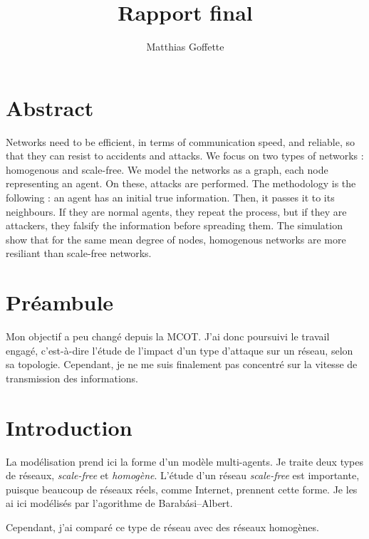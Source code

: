 \documentclass[11pt,a4paper]{article}
\title{Rapport final}
\author{Matthias Goffette}
\begin{document}
\maketitle

\section{Abstract} %

	Networks need to be efficient, in terms of communication speed, and reliable, so that they can resist to accidents and attacks. We focus on two types of networks : homogenous and scale-free. We model the networks as a graph, each node representing an agent. On these, attacks are performed. The methodology is the following : an agent has an initial true information. Then, it passes it to its neighbours. If they are normal agents, they repeat the process, but if they are attackers, they falsify the information before spreading them. The simulation show that for the same mean degree of nodes, homogenous networks are more resiliant than scale-free networks.



\section{Préambule} %

	Mon objectif a peu changé depuis la MCOT. J'ai donc poursuivi le travail engagé, c'est-à-dire l'étude de l'impact d'un type d'attaque sur un réseau, selon sa topologie. Cependant, je ne me suis finalement pas concentré sur la vitesse de transmission des informations.

\section{Introduction} %

	La modélisation prend ici la forme d'un modèle multi-agents. Je traite deux types de réseaux, \emph{scale-free} et \emph{homogène}. L'étude d'un réseau \emph{scale-free} est importante, puisque beaucoup de réseaux réels, comme Internet, prennent cette forme. Je les ai ici modélisés par l'agorithme de Barabási–Albert.
	
	 Cependant, j'ai comparé ce type de réseau avec des réseaux homogènes.
\end{document}
